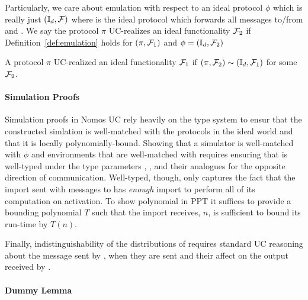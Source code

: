 \begin{definition}[Emulation]
\end{definition}


Particularly, we care about emulation with respect to an ideal protocol $\phi$ which is really just $(\mathbb{I}_d, \mathcal{F})$ where \idealP is the ideal protocol which forwards all messages to/from \Environment and \F.
We say the protocol $\pi$ UC-realizes an ideal functionality $\mathcal{F}_2$ if Definition~\ref{def:emulation} holds for $(\pi, \mathcal{F}_1)$ and  $\phi = (\mathbb{I}_d, \mathcal{F}_2)$

\begin{definition}[UC-Realize]
A protocol $\pi$ UC-realized an ideal functionality $\mathcal{F}_1$ if $(\pi, \mathcal{F}_2) \sim (\mathbb{I}_d, \mathcal{F}_1)$ for some $\mathcal{F}_2$.
\end{definition}

\paragraph{Simulation Proofs}
Simulation proofs in Nomos UC rely heavily on the type system to ensur that the constructed simlation is well-matched with the protocols in the ideal world and that it is locally polynomially-bound.
Showing that a simulator is well-matched with $\phi$ and environments \Environment that are well-matched with \Adversary requires ensuring that \Simulator is well-typed under the type parameters , ,  and their analogues for the opposite direction of communication. 
Well-typed, though, only captures the fact that the import sent with messages to \Simulator has \textit{enough} import to perform all of its computation on activation. 
To show  polynomial in PPT it suffices to provide a bounding polynomial $T$ such that the import \Simulator receives, $n$, is sufficient to bound its run-time by $T(n)$. 

Finally, indistinguishability of the distributions of  requires standard UC reasoning about the message sent by \Simulator, when they are sent and their affect on the output received by \Environment.

\paragraph{Dummy Lemma}

